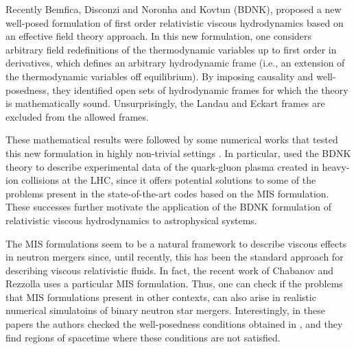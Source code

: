 \documentclass[prd,aps,twocolumn,floats,floatfix,nofootinbib,superscriptaddress] {revtex4-1}
\begin{document}
Recently Bemfica, Disconzi and Noronha \cite{Bemfica:2017wps,Bemfica:2019knx} and Kovtun \cite{Kovtun:2019hdm} (BDNK), proposed a new well-posed formulation of first order relativistic viscous hydrodynamics based on an effective field theory approach. In this new formulation, one considers arbitrary field redefinitions of the thermodynamic variables up to first order in derivatives, which defines an arbitrary hydrodynamic frame (i.e., an extension of the thermodynamic variables off equilibrium). By imposing causality and well-posedness, they identified open sets of hydrodynamic frames for which the theory is mathematically sound. Unsurprisingly, the Landau and Eckart frames are excluded from the allowed frames. 



These mathematical results were followed by some numerical works that tested this new formulation in highly non-trivial settings \cite{Pandya:2021ief,Bantilan:2022ech,Bea:2023rru,Pandya:2022pif,Pandya:2022sff,keeble2025firstorderviscousrelativistichydrodynamics,Hatton:2025crr,fantini2025constraintinstabilitiesfirstorderviscous,Hatton:2024jyt}. 
In particular, \cite{Bea:2025eov} used the BDNK theory  to describe experimental data of the quark-gluon plasma created in heavy-ion collisions at the LHC, since it offers potential solutions to some of the problems present in the state-of-the-art codes based on the MIS formulation. These successes further motivate the application of the BDNK formulation of relativistic viscous hydrodynamics to astrophysical systems.


The MIS formulations seem to be a natural framework to describe viscous effects in neutron mergers since, until recently, this has been the standard approach for describing viscous relativistic fluids. 
In fact, the recent work of Chabanov and Rezzolla \cite{Chabanov:2021dee,Chabanov:2023abq,Chabanov:2023blf} uses a particular MIS formulation. Thus, one can check if the problems that MIS formulations present in other contexts, can also arise in realistic numerical simulatoins of binary neutron star mergers. Interestingly, in these papers the authors checked the well-posedness conditions obtained in \cite{Bemfica:2020xym}, and they find regions of spacetime where these conditions are not satisfied. 
\end{document}

